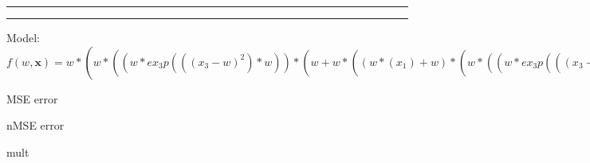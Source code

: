 \documentclass[12pt]{article}
\begin{document}
\hrule
\vspace{1cm}
\hrule
\vspace{1cm}
Model: $f(w,\mathbf{x})=w*(w*((w*ex_3p(((x_3-w)^2)*w))*(w+w*((w*(x_1)+w)*(w*((w*ex_3p(((x_3-w)^2)*w))*(w+w*((w*(x_1)+w)*(sin(x_3)+w*ex_1p(((x_1-w)^2)*w)))+w))^2+w*((w*ex_3p(((x_3-w)^2)*w))*(w+w*((w*(x_1)+w)*(sin(x_3)+w*ex_1p(((x_1-w)^2)*w)))+w))+w))+w))^2+w*((w*ex_3p(((x_3-w)^2)*w))*(w+w*((w*(x_1)+w)*(w*((w*ex_3p(((x_3-w)^2)*w))*(w+w*((w*(x_1)+w)*(sin(x_3)+w*ex_1p(((x_1-w)^2)*w)))+w))^2+w*((w*ex_3p(((x_3-w)^2)*w))*(w+w*((w*(x_1)+w)*(sin(x_3)+w*ex_1p(((x_1-w)^2)*w)))+w))+w))+w))+w)$

MSE error

nMSE error


\begin{bundle}{mult}\end{bundle}
\end{document}
